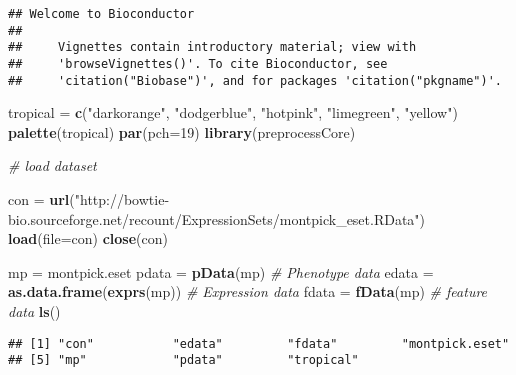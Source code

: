 \documentclass[]{article}
\newenvironment{Shaded}{\begin{snugshade}}{\end{snugshade}}
\newcommand{\KeywordTok}[1]{\textcolor[rgb]{0.13,0.29,0.53}{\textbf{#1}}}
\newcommand{\DataTypeTok}[1]{\textcolor[rgb]{0.13,0.29,0.53}{#1}}
\newcommand{\DecValTok}[1]{\textcolor[rgb]{0.00,0.00,0.81}{#1}}
\newcommand{\StringTok}[1]{\textcolor[rgb]{0.31,0.60,0.02}{#1}}
\newcommand{\CommentTok}[1]{\textcolor[rgb]{0.56,0.35,0.01}{\textit{#1}}}
\newcommand{\NormalTok}[1]{#1}
\begin{document}
\begin{verbatim}
## Welcome to Bioconductor
## 
##     Vignettes contain introductory material; view with
##     'browseVignettes()'. To cite Bioconductor, see
##     'citation("Biobase")', and for packages 'citation("pkgname")'.
\end{verbatim}

\begin{Shaded}
\begin{Highlighting}[]
\NormalTok{tropical =}\StringTok{ }\KeywordTok{c}\NormalTok{(}\StringTok{"darkorange"}\NormalTok{, }\StringTok{"dodgerblue"}\NormalTok{, }\StringTok{"hotpink"}\NormalTok{, }\StringTok{"limegreen"}\NormalTok{, }\StringTok{"yellow"}\NormalTok{)}
\KeywordTok{palette}\NormalTok{(tropical)}
\KeywordTok{par}\NormalTok{(}\DataTypeTok{pch=}\DecValTok{19}\NormalTok{)}
\KeywordTok{library}\NormalTok{(preprocessCore)}
\end{Highlighting}
\end{Shaded}

\begin{Shaded}
\begin{Highlighting}[]
\CommentTok{# load dataset}

\NormalTok{con =}\StringTok{ }\KeywordTok{url}\NormalTok{(}\StringTok{"http://bowtie-bio.sourceforge.net/recount/ExpressionSets/montpick_eset.RData"}\NormalTok{)}
\KeywordTok{load}\NormalTok{(}\DataTypeTok{file=}\NormalTok{con)}
\KeywordTok{close}\NormalTok{(con)}

\NormalTok{mp =}\StringTok{ }\NormalTok{montpick.eset}
\NormalTok{pdata =}\StringTok{ }\KeywordTok{pData}\NormalTok{(mp) }\CommentTok{# Phenotype data}
\NormalTok{edata =}\StringTok{ }\KeywordTok{as.data.frame}\NormalTok{(}\KeywordTok{exprs}\NormalTok{(mp)) }\CommentTok{# Expression data}
\NormalTok{fdata =}\StringTok{ }\KeywordTok{fData}\NormalTok{(mp) }\CommentTok{# feature data}
\KeywordTok{ls}\NormalTok{()}
\end{Highlighting}
\end{Shaded}

\begin{verbatim}
## [1] "con"           "edata"         "fdata"         "montpick.eset"
## [5] "mp"            "pdata"         "tropical"
\end{verbatim}
\end{document}
